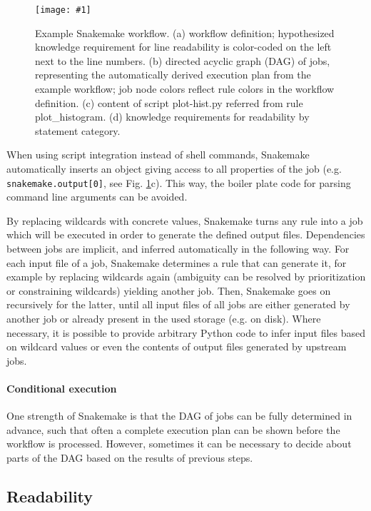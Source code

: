 \documentclass[parskip=half]{scrartcl}
\newcommand{\image}[1]{\centering\texttt{[image: \#1]}}
\begin{document}
\begin{figure}
	\image{example-workflow.pdf}
	\caption{
		Example Snakemake workflow. (a) workflow definition; hypothesized knowledge requirement for line readability is color-coded on the left next to the line numbers. (b) directed acyclic graph (DAG) of jobs, representing the automatically derived execution plan from the example workflow; job node colors reflect rule colors in the workflow definition. (c) content of script plot-hist.py referred from rule plot\_histogram. (d) knowledge requirements for readability by statement category.
	}
	\label{fig:example}
\end{figure}

When using script integration instead of shell commands, Snakemake automatically inserts an object giving access to all properties of the job (e.g. \lstinline!snakemake.output[0]!, see Fig.
\ref{fig:example}c).
This way, the boiler plate code for parsing command line arguments can be avoided.

By replacing wildcards with concrete values, Snakemake turns any rule into a job which will be executed in order to generate the defined output files.
Dependencies between jobs are implicit, and inferred automatically in the following way.
For each input file of a job, Snakemake determines a rule that can generate it, for example by replacing wildcards again (ambiguity can be resolved by prioritization or constraining wildcards) yielding another job.
Then, Snakemake goes on recursively for the latter, until all input files of all jobs are either generated by another job or already present in the used storage (e.g. on disk).
Where necessary, it is possible to provide arbitrary Python code to infer input files based on wildcard values or even the contents of output files generated by upstream jobs.

\paragraph{Conditional execution}
One strength of Snakemake is that the DAG of jobs can be fully determined in advance, such that often a complete execution plan can be shown before the workflow is processed.
However, sometimes it can be necessary to decide about parts of the DAG based on the results of previous steps.

\subsection{Readability}
\end{document}
